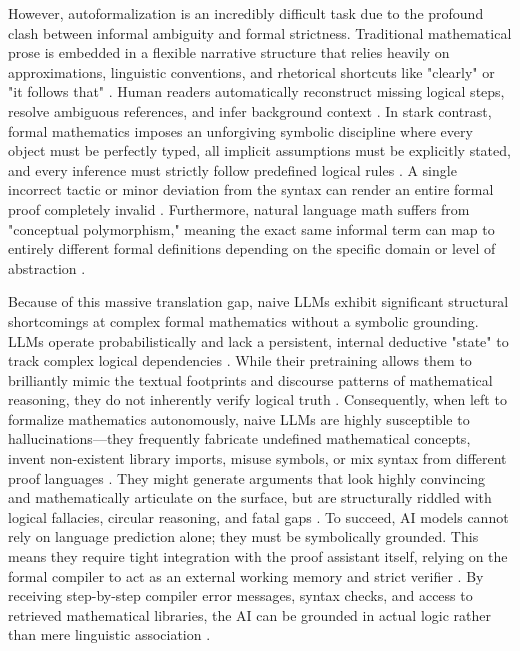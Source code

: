 However, autoformalization is an incredibly difficult task due to the profound clash between informal ambiguity and formal strictness. Traditional mathematical prose is embedded in a flexible narrative structure that relies heavily on approximations, linguistic conventions, and rhetorical shortcuts like "clearly" or "it follows that" \cite{asperti_thinking_2026}. Human readers automatically reconstruct missing logical steps, resolve ambiguous references, and infer background context \cite{asperti_thinking_2026}. In stark contrast, formal mathematics imposes an unforgiving symbolic discipline where every object must be perfectly typed, all implicit assumptions must be explicitly stated, and every inference must strictly follow predefined logical rules \cite{asperti_thinking_2026}. A single incorrect tactic or minor deviation from the syntax can render an entire formal proof completely invalid \cite{asperti_thinking_2026}. Furthermore, natural language math suffers from "conceptual polymorphism," meaning the exact same informal term can map to entirely different formal definitions depending on the specific domain or level of abstraction \cite{wang_m2f_2026}.

Because of this massive translation gap, naive LLMs exhibit significant structural shortcomings at complex formal mathematics without a symbolic grounding. LLMs operate probabilistically and lack a persistent, internal deductive "state" to track complex logical dependencies \cite{asperti_thinking_2026}. While their pretraining allows them to brilliantly mimic the textual footprints and discourse patterns of mathematical reasoning, they do not inherently verify logical truth \cite{asperti_thinking_2026}. Consequently, when left to formalize mathematics autonomously, naive LLMs are highly susceptible to hallucinations—they frequently fabricate undefined mathematical concepts, invent non-existent library imports, misuse symbols, or mix syntax from different proof languages \cite{wang_m2f_2026, biyani_indimathbench_2025-1}. They might generate arguments that look highly convincing and mathematically articulate on the surface, but are structurally riddled with logical fallacies, circular reasoning, and fatal gaps \cite{asperti_thinking_2026}. To succeed, AI models cannot rely on language prediction alone; they must be symbolically grounded. This means they require tight integration with the proof assistant itself, relying on the formal compiler to act as an external working memory and strict verifier \cite{asperti_thinking_2026}. By receiving step-by-step compiler error messages, syntax checks, and access to retrieved mathematical libraries, the AI can be grounded in actual logic rather than mere linguistic association \cite{asperti_thinking_2026, wang_m2f_2026}.

